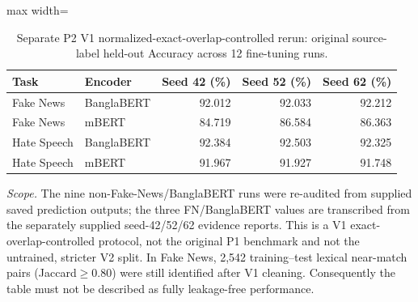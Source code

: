 \begin{table}[p]
\centering
\caption{Separate P2 V1 normalized-exact-overlap-controlled rerun:
original source-label held-out Accuracy across 12 fine-tuning runs.}
\label{tab:p2runs}
\footnotesize
\begin{adjustbox}{max width=\linewidth}
\begin{tabular}{llrrr}
\toprule
Task & Encoder & Seed 42 (\%) & Seed 52 (\%) & Seed 62 (\%) \\
\midrule
Fake News & BanglaBERT & 92.012 & 92.033 & 92.212 \\
Fake News & mBERT & 84.719 & 86.584 & 86.363 \\
Hate Speech & BanglaBERT & 92.384 & 92.503 & 92.325 \\
Hate Speech & mBERT & 91.967 & 91.927 & 91.748 \\
\bottomrule
\end{tabular}
\end{adjustbox}
\par\smallskip
\begin{minipage}{\linewidth}\scriptsize
\emph{Scope.} The nine non-Fake-News/BanglaBERT runs were re-audited
from supplied saved prediction outputs; the three FN/BanglaBERT values
are transcribed from the separately supplied seed-42/52/62 evidence
reports. This is a V1 exact-overlap-controlled protocol, not the original
P1 benchmark and not the untrained, stricter V2 split. In Fake News,
2,542 training--test lexical near-match pairs (Jaccard$\geq0.80$)
were still identified after V1 cleaning. Consequently the table must
not be described as fully leakage-free performance.
\end{minipage}
\end{table}
